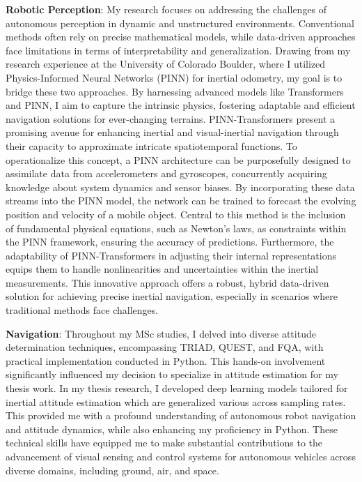 \documentclass[a4,20pt]{article}
\begin{document}
\begin{large}
\textbf{Robotic Perception}: My research focuses on addressing the challenges of autonomous perception in dynamic and unstructured environments. Conventional methods often rely on precise mathematical models, while data-driven approaches face limitations in terms of interpretability and generalization. Drawing from my research experience at the University of Colorado Boulder, where I utilized Physics-Informed Neural Networks (PINN) for inertial odometry, my goal is to bridge these two approaches. By harnessing advanced models like Transformers and PINN, I aim to capture the intrinsic physics, fostering adaptable and efficient navigation solutions for ever-changing terrains. PINN-Transformers present a promising avenue for enhancing inertial and visual-inertial navigation through their capacity to approximate intricate spatiotemporal functions. To operationalize this concept, a PINN architecture can be purposefully designed to assimilate data from accelerometers and gyroscopes, concurrently acquiring knowledge about system dynamics and sensor biases. By incorporating these data streams into the PINN model, the network can be trained to forecast the evolving position and velocity of a mobile object. Central to this method is the inclusion of fundamental physical equations, such as Newton's laws, as constraints within the PINN framework, ensuring the accuracy of predictions. Furthermore, the adaptability of PINN-Transformers in adjusting their internal representations equips them to handle nonlinearities and uncertainties within the inertial measurements. This innovative approach offers a robust, hybrid data-driven solution for achieving precise inertial navigation, especially in scenarios where traditional methods face challenges.\vspace{-0.35cm}


\textbf{Navigation}: Throughout my MSc studies, I delved into diverse attitude determination techniques, encompassing TRIAD, QUEST, and FQA, with practical implementation conducted in Python. This hands-on involvement significantly influenced my decision to specialize in attitude estimation for my thesis work. In my thesis research, I developed deep learning models tailored for inertial attitude estimation which are generalized various across sampling rates. This provided me with a profound understanding of autonomous robot navigation and attitude dynamics, while also enhancing my proficiency in Python. These technical skills have equipped me to make substantial contributions to the advancement of visual sensing and control systems for autonomous vehicles across diverse domains, including ground, air, and space. \vspace{-0.35cm}



\end{large}
\end{document}
